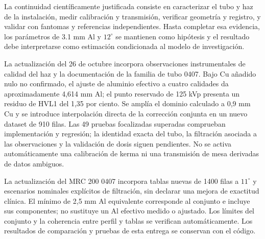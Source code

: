La continuidad científicamente justificada consiste en caracterizar el tubo y haz de la instalación, medir calibración y transmisión, verificar geometría y registro, y validar con fantomas y referencias independientes. Hasta completar esa evidencia, los parámetros de \num{3.1} mm Al y $12^\circ$ se mantienen como hipótesis y el resultado debe interpretarse como estimación condicionada al modelo de investigación.

La actualización del 26 de octubre incorpora observaciones instrumentales de calidad del haz y la documentación de la familia de tubo 0407. Bajo Cu añadido nulo no confirmado, el ajuste de aluminio efectivo a cuatro calidades da aproximadamente 4,614 mm Al; el punto reservado de 125 kVp presenta un residuo de HVL1 del 1,35 por ciento. Se amplía el dominio calculado a 0,9 mm Cu y se introduce interpolación directa de la corrección conjunta en un nuevo dataset de 910 filas. Las 49 pruebas focalizadas superadas comprueban implementación y regresión; la identidad exacta del tubo, la filtración asociada a las observaciones y la validación de dosis siguen pendientes. No se activa automáticamente una calibración de kerma ni una transmisión de mesa derivadas de datos ambiguos.

La actualización del MRC 200 0407 incorpora tablas nuevas de 1400 filas a $11^\circ$ y escenarios nominales explícitos de filtración, sin declarar una mejora de exactitud clínica. El mínimo de 2,5 mm Al equivalente corresponde al conjunto e incluye sus componentes; no sustituye un Al efectivo medido o ajustado. Los límites del conjunto y la coherencia entre perfil y tablas se verifican automáticamente. Los resultados de comparación y pruebas de esta entrega se conservan con el código.
